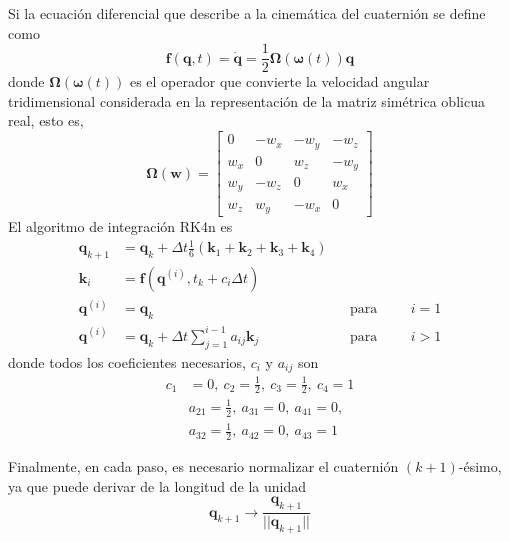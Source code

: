 Si la ecuación diferencial que describe a la cinemática del cuaternión se define como
\begin{equation}
    \bm{f}(\bm{q},t) = \dot{\bm{q}} = \frac{1}{2}\bm{\Omega}(\bm{\omega}(t))\bm{q}
\end{equation}
donde $\bm{\Omega}(\bm{\omega}(t))$ es el operador que convierte la velocidad angular tridimensional considerada en la representación de la matriz simétrica oblicua real, esto es,
\begin{equation}
    \bm{\Omega}(\bm{w}) = 
    \begin{bmatrix}
        0 & -w_x & -w_y & -w_z \\
        w_x & 0 & w_z & -w_y \\
        w_y & -w_z & 0 & w_x \\
        w_z & w_y & -w_x & 0
    \end{bmatrix}
\end{equation}
El algoritmo de integración RK4n es
\begin{align}
    \bm{q}_{k+1} &= \bm{q}_k + \Delta t\frac{1}{6}(\bm{k}_1 +\bm{k}_2 + \bm{k}_3 + \bm{k}_4) \\
    \bm{k}_i &= \bm{f}(\bm{q}^{(i)},t_k+c_i\Delta t) \\
    \bm{q}^{(i)} &= \bm{q}_k &&\text{para} &&&i=1 \\
    \bm{q}^{(i)} &= \bm{q}_k + \Delta t\sum_{j=1}^{i-1}a_{ij}\bm{k}_j &&\text{para} &&&i>1
\end{align}
donde todos los coeficientes necesarios, $c_i$ y $a_{ij}$ son
\begin{align*}
    c_1 &= 0,\ c_2 = \frac{1}{2},\ c_3 = \frac{1}{2},\ c_4 = 1 \\
    &a_{21} = \frac{1}{2},\ a_{31} = 0,\ a_{41} = 0, \\
    &a_{32} = \frac{1}{2},\ a_{42} = 0,\ a_{43} = 1
\end{align*}

Finalmente, en cada paso, es necesario normalizar el cuaternión $(k+1)$-ésimo, ya que puede derivar de la longitud de la unidad
\begin{equation}
    \bm{q}_{k+1} \rightarrow \frac{\bm{q}_{k+1}}{||\bm{q}_{k+1}||}
\end{equation}

